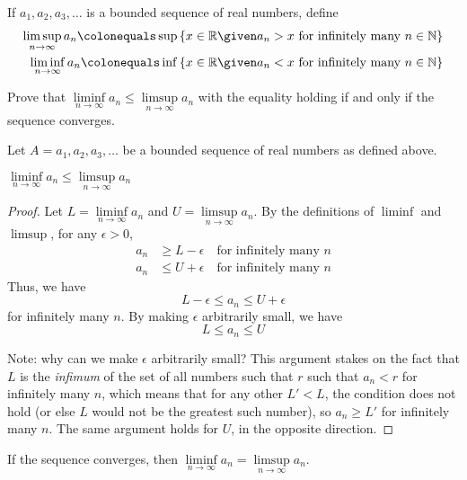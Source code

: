 \begin{problem}
  If $a_1, a_2, a_3, \ldots$ is a bounded sequence of real numbers, define
  \begin{align*}
    \limsup\limits_{n \to \infty}{a_n}
    \colonequals
    \sup \set{x \in \R \given a_n > x \text{ for infinitely many } n \in \N}
    \\
    \liminf\limits_{n \to \infty}{a_n}
    \colonequals
    \inf \set{x \in \R \given a_n < x \text{ for infinitely many } n \in \N}
  \end{align*}

  Prove that $\liminf\limits_{n \to \infty}{a_n} \leq \limsup\limits_{n \to \infty}{a_n}$
  with the equality holding if and only if the sequence converges.
\end{problem}

\begin{answer}
  Let $A = a_1, a_2, a_3, \ldots$ be a bounded sequence of real numbers as defined above.

  \begin{claim}
    $\liminf\limits_{n \to \infty}{a_n} \leq \limsup\limits_{n \to \infty}{a_n}$
    \begin{proof}
      Let $L = \liminf\limits_{n \to \infty}{a_n}$ and $U = \limsup\limits_{n \to \infty}{a_n}$.
      By the definitions of $\liminf$ and $\limsup$, for any $\epsilon > 0$,
      \begin{align*}
        a_n &\ge L - \epsilon \quad \text{for infinitely many } n \\
        a_n &\le U + \epsilon \quad \text{for infinitely many } n 
      \end{align*}
      Thus, we have
      \[ L - \epsilon \le a_n \le U + \epsilon \]
      for infinitely many $n$.
      By making $\epsilon$ arbitrarily small, we have
      \[ L \le a_n \le U \]

      \step
      Note: why can we make $\epsilon$ arbitrarily small?
      This argument stakes on the fact that $L$ is the \emph{infimum} of the set of all
      numbers such that $r$ such that $a_n < r$ for infinitely many $n$,
      which means that for any other $L' < L$,
      the condition does not hold (or else $L$ would not be the greatest such number),
      so $a_n \ge L'$ for infinitely many $n$.
      The same argument holds for $U$, in the opposite direction.
    \end{proof}
  \end{claim}

  \newpage
  \begin{claim}
    If the sequence converges, then $\liminf\limits_{n \to \infty}{a_n} = \limsup\limits_{n \to \infty}{a_n}$.


\end{claim}
\end{answer}
